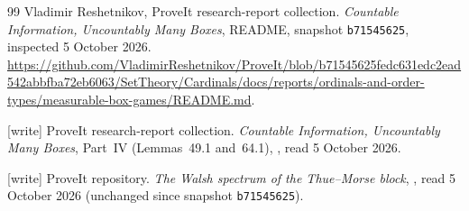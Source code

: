 \documentclass[11pt,a4paper]{article}
\theoremstyle{definition}
\theoremstyle{remark}
\begin{document}
\begin{thebibliography}{99}
Vladimir Reshetnikov, ProveIt research-report collection.
\emph{Countable Information, Uncountably Many Boxes}, README,
snapshot \texttt{b71545625}, inspected 5 October 2026.
\url{https://github.com/VladimirReshetnikov/ProveIt/blob/b71545625fedc631edc2ead542abbfba72eb6063/SetTheory/Cardinals/docs/reports/ordinals-and-order-types/measurable-box-games/README.md}.

[write] ProveIt research-report collection.
\emph{Countable Information, Uncountably Many Boxes}, Part~IV (Lemmas~49.1
and~64.1),
,
read 5 October 2026.

[write] ProveIt repository.
\emph{The Walsh spectrum of the Thue--Morse block},
,
read 5 October 2026 (unchanged since snapshot \texttt{b71545625}).
\end{thebibliography}
\end{document}
